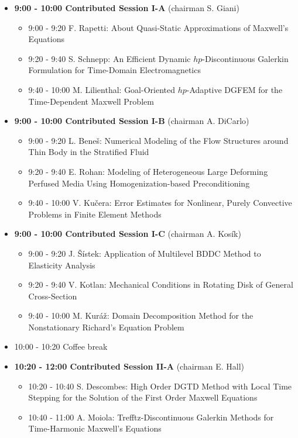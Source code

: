 \documentclass[10pt, A4]{article}%
\begin{document}
\begin{itemize}    
  \item {\bf 9:00 - 10:00 Contributed Session I-A} (chairman S. Giani) 
  \begin{itemize}
    \item 9:00 - 9:20 F. Rapetti: About Quasi-Static Approximations of Maxwell's Equations
    \item 9:20 - 9:40 S. Schnepp: An Efficient Dynamic $hp$-Discontinuous Galerkin Formulation for Time-Domain Electromagnetics
    \item 9:40 - 10:00 M. Lilienthal: Goal-Oriented $hp$-Adaptive DGFEM for the Time-Dependent Maxwell Problem
  \end{itemize}
  \item {\bf 9:00 - 10:00 Contributed Session I-B} (chairman A. DiCarlo) 
  \begin{itemize}
    \item 9:00 - 9:20 L. Bene\v{s}: Numerical Modeling of the Flow Structures around Thin Body in the Stratified Fluid
    \item 9:20 - 9:40 E. Rohan: Modeling of Heterogeneous Large Deforming Perfused Media Using Homogenization-based Preconditioning
    \item 9:40 - 10:00 V. Ku\v{c}era: Error Estimates for Nonlinear, Purely Convective Problems in Finite Element Methods
  \end{itemize}
    \item {\bf 9:00 - 10:00 Contributed Session I-C} (chairman A. Kos\'{i}k) 
  \begin{itemize}
    \item 9:00 - 9:20 J. \v{S}\'{i}stek: Application of Multilevel BDDC Method to Elasticity Analysis  
    \item 9:20 - 9:40 V. Kotlan: Mechanical Conditions in Rotating Disk of General Cross-Section
    \item 9:40 - 10:00 M. Kur\'{a}\v{z}: Domain Decomposition Method for the Nonstationary Richard's Equation Problem
  \end{itemize}
  \item 10:00 - 10:20 Coffee break
  \item {\bf 10:20 - 12:00 Contributed Session II-A} (chairman E. Hall) 
  \begin{itemize}
    \item 10:20 - 10:40 S. Descombes: High Order DGTD Method with Local Time Stepping for the Solution of the First Order Maxwell Equations
    \item 10:40 - 11:00 A. Moiola: Trefftz-Discontinuous Galerkin Methods for Time-Harmonic Maxwell’s Equations

\end{itemize}
\end{itemize}
\end{document}
